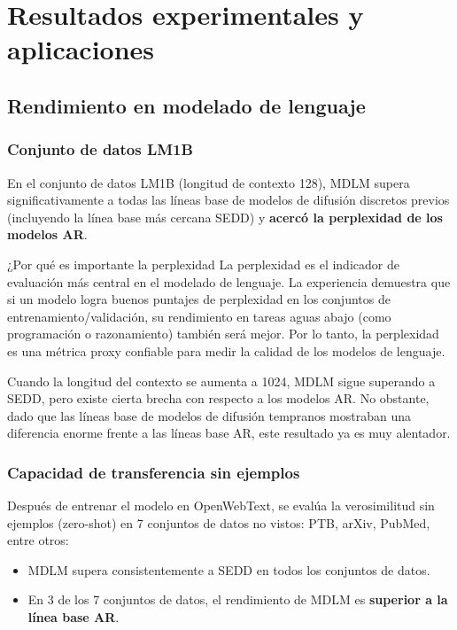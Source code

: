 \section{Resultados experimentales y aplicaciones}

\subsection{Rendimiento en modelado de lenguaje}

\subsubsection{Conjunto de datos LM1B}

En el conjunto de datos LM1B (longitud de contexto 128), MDLM supera significativamente a todas las líneas base de modelos de difusión discretos previos (incluyendo la línea base más cercana SEDD) y \textbf{acercó la perplexidad de los modelos AR}.

\begin{knowledgebox}{¿Por qué es importante la perplexidad}
La perplexidad es el indicador de evaluación más central en el modelado de lenguaje. La experiencia demuestra que si un modelo logra buenos puntajes de perplexidad en los conjuntos de entrenamiento/validación, su rendimiento en tareas aguas abajo (como programación o razonamiento) también será mejor. Por lo tanto, la perplexidad es una métrica proxy confiable para medir la calidad de los modelos de lenguaje.
\end{knowledgebox}

Cuando la longitud del contexto se aumenta a 1024, MDLM sigue superando a SEDD, pero existe cierta brecha con respecto a los modelos AR. No obstante, dado que las líneas base de modelos de difusión tempranos mostraban una diferencia enorme frente a las líneas base AR, este resultado ya es muy alentador.

\subsubsection{Capacidad de transferencia sin ejemplos}

Después de entrenar el modelo en OpenWebText, se evalúa la verosimilitud sin ejemplos (zero-shot) en 7 conjuntos de datos no vistos: PTB, arXiv, PubMed, entre otros:
\begin{itemize}
    \item MDLM supera consistentemente a SEDD en todos los conjuntos de datos.
    \item En 3 de los 7 conjuntos de datos, el rendimiento de MDLM es \textbf{superior a la línea base AR}.
\end{itemize}

